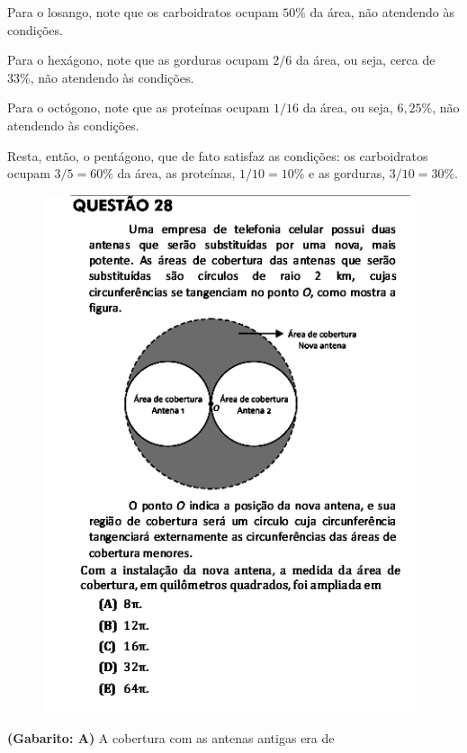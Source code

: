 \documentclass[a4paper]{article}
\begin{document}
\par\vspace{0.3cm} Para o losango, note que os carboidratos ocupam $50\%$ da área, não atendendo às condições.
\par\vspace{0.3cm} Para o hexágono, note que as gorduras ocupam $2/6$ da área, ou seja, cerca de $33\%$, não atendendo às condições.
\par\vspace{0.3cm} Para o octógono, note que as proteínas ocupam $1/16$ da área, ou seja, $6,25\%$, não atendendo às condições.
\par\vspace{0.3cm} Resta, então, o pentágono, que de fato satisfaz as condições: os carboidratos ocupam $3/5 = 60\%$ da área, as proteínas, $1/10 = 10\%$ e as gorduras, $3/10 = 30\%$.
\begin{figure}[H]
	\begin{center}
		\includegraphics[width=11cm]{L5Q28.png}
	\end{center}
\end{figure}
\par\textbf{(Gabarito: A)} A cobertura com as antenas antigas era de
\end{document}
